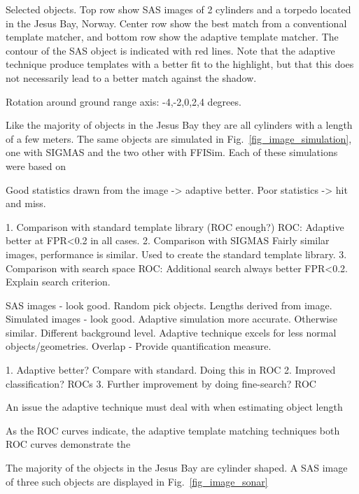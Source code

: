 \documentclass[10pt,journal,draftclsnofoot,onecolumn]{IEEEtran}
\newcommand\Fig[1]{Fig.~\ref{#1}}
\newcommand\1{\vec 1}
\begin{document}
Selected objects. Top row show SAS images of 2 cylinders and a torpedo located in the Jesus Bay, Norway. Center row show the best match from a conventional template matcher, and bottom row show the adaptive template matcher. The contour of the SAS object is indicated with red lines. Note that the adaptive technique produce templates with a better fit to the highlight, but that this does not necessarily lead to a better match against the shadow.

Rotation around ground range axis: -4,-2,0,2,4 degrees.

Like the majority of objects in the Jesus Bay they are all cylinders with a length of a few meters. The same objects are simulated in \Fig{fig_image_simulation}, one with SIGMAS and the two other with FFISim. Each of these simulations were based on 





Good statistics drawn from the image -> adaptive better. Poor statistics -> hit and miss.




1. Comparison with standard template library (ROC enough?)
   ROC: Adaptive better at FPR<0.2 in all cases.
2. Comparison with SIGMAS
   Fairly similar images, performance is similar. 
   Used to create the standard template library.
3. Comparison with search space
   ROC: Additional search always better FPR<0.2.
   Explain search criterion.



SAS images - look good. Random pick objects. Lengths derived from image.
Simulated images - look good. Adaptive simulation more accurate. Otherwise similar. Different background level. Adaptive technique excels for less normal objects/geometries.
Overlap - Provide quantification measure. 


1. Adaptive better? Compare with standard. Doing this in ROC
2. Improved classification? ROCs
3. Further improvement by doing fine-search? ROC


An issue the adaptive technique must deal with when estimating object length 

As the ROC curves indicate, the adaptive template matching techniques both  ROC curves demonstrate the 

The majority of the objects in the Jesus Bay are cylinder shaped. A SAS image of three such objects are displayed in \Fig{fig_image_sonar}
\end{document}
